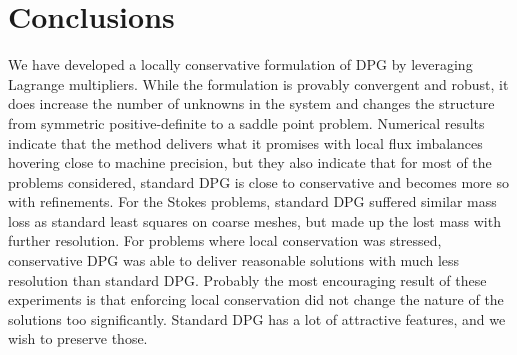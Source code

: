 \documentclass[letterpaper]{article}
\begin{document}
\section{Conclusions}
We have developed a locally conservative formulation of DPG by leveraging
Lagrange multipliers. While the formulation is provably convergent and robust, it does
increase the number of unknowns in the system and changes the structure from
symmetric positive-definite to a saddle point problem. Numerical results
indicate that the method delivers what it promises with local flux imbalances
hovering close to machine precision, but they also indicate that for most of the
problems considered, standard DPG is close to conservative and becomes more so
with refinements. For the Stokes problems, standard DPG suffered similar mass
loss as standard least squares on coarse meshes, but made up the lost mass with further
resolution. For problems where local conservation was stressed,
conservative DPG was able to deliver reasonable solutions with much less
resolution than standard DPG.
Probably the most encouraging result of these experiments is
that enforcing local conservation did not change the nature of the solutions
too significantly. Standard DPG has a lot of attractive features, and we wish
to preserve those.




\end{document}
